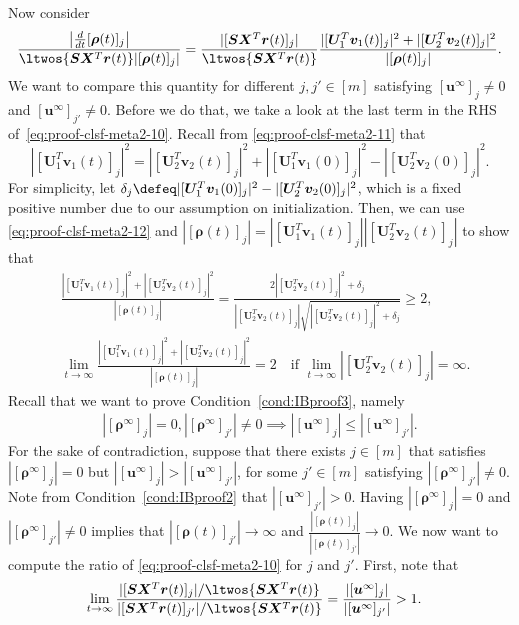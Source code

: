 \documentclass{article} %
\def\vr{{\bm{r}}}
\def\vu{{\bm{u}}}
\def\vv{{\bm{v}}}
\def\mS{{\bm{S}}}
\def\mU{{\bm{U}}}
\def\mX{{\bm{X}}}
\newcommand{\vrho}{{\bm{\rho}}}
\begin{document}
Now consider
\begin{align}
\label{eq:proof-clsf-meta2-10}
    \frac{\left | \frac{d}{dt} [\vrho(t)]_j \right |}{\ltwos{\mS \mX^T \vr(t)}|[\vrho(t)]_j|} 
    = \frac{|[\mS\mX^T \vr(t)]_j|}{\ltwos{\mS \mX^T \vr(t)}}\frac{|[\mU_1^T \vv_1(t)]_j|^2 + |[\mU_2^T \vv_2(t)]_j|^2}{|[\vrho(t)]_j|}.
\end{align}
We want to compare this quantity for different $j,j' \in [m]$ satisfying $[\vu^\infty]_j \neq 0$ and $[\vu^\infty]_{j'} \neq 0$. Before we do that, we take a look at the last term in the RHS of~\eqref{eq:proof-clsf-meta2-10}. Recall from \eqref{eq:proof-clsf-meta2-11} that 
\begin{equation}
\label{eq:proof-clsf-meta2-12}
|[\mU_1^T \vv_1(t)]_j|^2 = |[\mU_2^T \vv_2(t)]_j|^2+|[\mU_1^T \vv_1(0)]_j|^2- |[\mU_2^T \vv_2(0)]_j|^2.
\end{equation}
For simplicity, let $\delta_j \defeq |[\mU_1^T \vv_1(0)]_j|^2- |[\mU_2^T \vv_2(0)]_j|^2$, which is a fixed positive number due to our assumption on initialization. Then, we can use \eqref{eq:proof-clsf-meta2-12} and $|[\vrho(t)]_j|=|[\mU_1^T \vv_1(t)]_j||[\mU_2^T \vv_2(t)]_j|$ to show that
\begin{align}
	&\frac{|[\mU_1^T \vv_1(t)]_j|^2 + |[\mU_2^T \vv_2(t)]_j|^2}{|[\vrho(t)]_j|}
	=
	\frac{2 |[\mU_2^T \vv_2(t)]_j|^2 + \delta_j}
	{|[\mU_2^T \vv_2(t)]_j| \sqrt{|[\mU_2^T \vv_2(t)]_j|^2+\delta_j}}
	\geq 2,\label{eq:fix1}\\
	&\lim_{t \to \infty}
	\frac{|[\mU_1^T \vv_1(t)]_j|^2 + |[\mU_2^T \vv_2(t)]_j|^2}{|[\vrho(t)]_j|}
	= 2 \text{~~~if } \lim_{t \to \infty} |[\mU_2^T \vv_2(t)]_j| = \infty.\label{eq:fix2}
\end{align}
Recall that we want to prove Condition~\ref{cond:IBproof3}, namely
\begin{align*}
	|[\vrho^\infty]_j| = 0, |[\vrho^\infty]_{j'}| \neq 0 \implies
	|[\vu^\infty]_j| \leq |[\vu^\infty]_{j'}|.
\end{align*}
For the sake of contradiction, suppose that there exists $j \in [m]$ that satisfies $|[\vrho^\infty]_j| = 0$ but $|[\vu^\infty]_j| > |[\vu^\infty]_{j'}|$, for some $j' \in [m]$ satisfying $|[\vrho^\infty]_{j'}| \neq 0$.
Note from Condition~\ref{cond:IBproof2} that $|[\vu^\infty]_{j'}| > 0$.
Having $|[\vrho^\infty]_j| = 0$ and $|[\vrho^\infty]_{j'}| \neq 0$ implies that $|[\vrho(t)]_{j'}| \to \infty$ and $\frac{|[\vrho(t)]_j|}{|[\vrho(t)]_{j'}|} \to 0$.
We now want to compute the ratio of \eqref{eq:proof-clsf-meta2-10} for $j$ and $j'$. First, note that
\begin{align}
	\label{eq:proof-clsf-meta2-13}
	&\lim_{t \to \infty} 
	\frac{|[\mS\mX^T \vr(t)]_j|/\ltwos{\mS \mX^T \vr(t)}}
	{|[\mS\mX^T \vr(t)]_{j'}|/\ltwos{\mS \mX^T \vr(t)}}
	= \frac{|[\vu^\infty]_j|}{|[\vu^\infty]_{j'}|} > 1.
\end{align}
\end{document}
